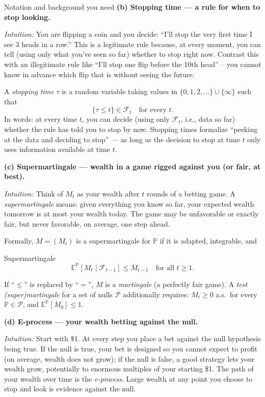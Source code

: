 \documentclass[aspectratio=169,10pt]{beamer}
\begin{document}
\begin{frame}[allowframebreaks]{Notation and background you need}
\textbf{(b) Stopping time --- a rule for when to stop looking.}

\emph{Intuition:} You are flipping a coin and you decide: ``I'll stop the very first time I see 3 heads in a row.''
This is a legitimate rule because, at every moment, you can tell (using only what you've seen so far) whether to
stop right now. Contrast this with an illegitimate rule like ``I'll stop one flip before the 10th head'' --
you cannot know in advance which flip that is without seeing the future.

A \emph{stopping time} $\tau$ is a random variable taking values in $\{0,1,2,\dots\} \cup \{\infty\}$ such that
$$\{\tau \le t\} \in \mathcal{F}_t \quad \text{for every } t.$$
In words: at every time $t$, you can decide (using only $\mathcal{F}_t$, i.e., data so far) whether the rule has
told you to stop by now. Stopping times formalize ``peeking at the data and deciding to stop'' --- as long as the
decision to stop at time $t$ only uses information available at time $t$.

\framebreak

\textbf{(c) Supermartingale --- wealth in a game rigged against you (or fair, at best).}

\emph{Intuition:} Think of $M_t$ as your wealth after $t$ rounds of a betting game. A \emph{supermartingale} means:
given everything you know so far, your expected wealth tomorrow is at most your wealth today. The game may be
unfavorable or exactly fair, but never favorable, on average, one step ahead.

Formally, $M = (M_t)$ is a supermartingale for $\mathbb{P}$ if it is adapted, integrable, and
\begin{block}{Supermartingale}
$$\mathbb{E}^{\mathbb{P}}[M_t \mid \mathcal{F}_{t-1}] \le M_{t-1} \quad \text{for all } t \ge 1.$$
\end{block}
If ``$\le$'' is replaced by ``$=$'', $M$ is a \emph{martingale} (a perfectly fair game). A \emph{test
(super)martingale} for a set of nulls $\mathcal{P}$ additionally requires: $M_t \ge 0$ a.s.\ for every
$\mathbb{P} \in \mathcal{P}$, and $\mathbb{E}^{\mathbb{P}}[M_0] \le 1$.

\framebreak

\textbf{(d) E-process --- your wealth betting against the null.}

\emph{Intuition:} Start with \$1. At every step you place a bet against the null hypothesis being true. If the null
is true, your bet is designed so you cannot expect to profit (on average, wealth does not grow); if the null is
false, a good strategy lets your wealth grow, potentially to enormous multiples of your starting \$1. The path of
your wealth over time is the \emph{e-process}. Large wealth at any point you choose to stop and look is evidence
against the null.


\end{frame}
\end{document}
